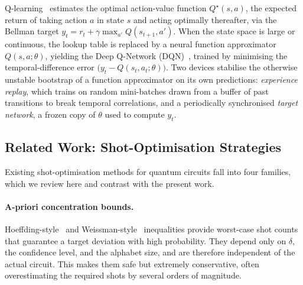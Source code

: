 \documentclass[runningheads]{llncs}
\begin{document}
Q-learning~\cite{watkins1992qlearning} estimates the optimal action-value
function $Q^{\star}(s,a)$, the expected return of taking action $a$ in state $s$
and acting optimally thereafter, via the Bellman target
$y_t = r_t + \gamma\max_{a'}Q(s_{t+1},a')$. When the state space is large or
continuous, the lookup table is replaced by a neural function approximator
$Q(s,a;\theta)$, yielding the Deep Q-Network (DQN)~\cite{mnih2015human}, trained
by minimising the temporal-difference error $\bigl(y_t-Q(s_t,a_t;\theta)\bigr)$.
Two devices stabilise the otherwise unstable bootstrap of a function
approximator on its own predictions: \emph{experience replay}, which trains on
random mini-batches drawn from a buffer of past transitions to break temporal
correlations, and a periodically synchronised \emph{target network}, a frozen
copy of $\theta$ used to compute $y_t$.

\subsection{Related Work: Shot-Optimisation Strategies}
\label{sec:relwork}

Existing shot-optimisation methods for quantum circuits fall into four families,
which we review here and contrast with the present work.

\paragraph{A-priori concentration bounds.} Hoeffding-style~\cite{hoeffding1963}
and Weissman-style~\cite{weissman2003inequalities} inequalities provide
worst-case shot counts that guarantee a target deviation with high probability.
They depend only on $\delta$, the confidence level, and the alphabet size, and
are therefore independent of the actual circuit. This makes them safe but
extremely conservative, often overestimating the required shots by several
orders of magnitude.
\end{document}
